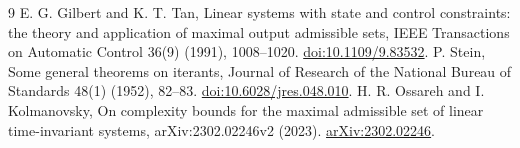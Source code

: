 \documentclass[11pt,a4paper]{article}
\begin{document}
\begin{thebibliography}{9}
 E. G. Gilbert and K. T. Tan,
Linear systems with state and control constraints: the theory and application
of maximal output admissible sets, IEEE Transactions on Automatic Control
36(9) (1991), 1008--1020.
\href{https://doi.org/10.1109/9.83532}{doi:10.1109/9.83532}.
 P. Stein, Some general theorems on iterants,
Journal of Research of the National Bureau of Standards 48(1)
(1952), 82--83. \href{https://doi.org/10.6028/jres.048.010}{doi:10.6028/jres.048.010}.
 H. R. Ossareh and I. Kolmanovsky,
On complexity bounds for the maximal admissible set of linear time-invariant
systems, arXiv:2302.02246v2 (2023).
\href{https://arxiv.org/abs/2302.02246}{arXiv:2302.02246}.
\end{thebibliography}
\end{document}

